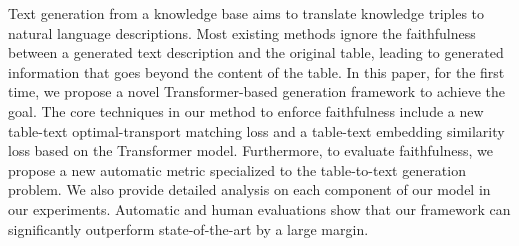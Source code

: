 Text generation from a knowledge base aims to translate knowledge triples to natural language descriptions. Most existing methods ignore the faithfulness between a generated text description and the original table, leading to generated information that goes beyond the content of the table. In this paper, for the first time, we propose a novel Transformer-based generation framework to achieve the goal. The core techniques in our method to enforce faithfulness include a new table-text optimal-transport matching loss and a table-text embedding similarity loss based on the Transformer model. Furthermore, to evaluate faithfulness, we propose a new automatic metric specialized to the table-to-text generation problem. We also provide detailed analysis on each component of our model in our experiments. Automatic and human evaluations show that our framework can significantly outperform state-of-the-art by a large margin.
